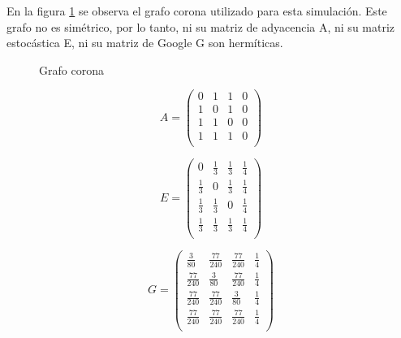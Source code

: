 En la figura \ref{fig:crown} se observa el grafo corona utilizado para esta simulación. Este grafo no es simétrico, por lo tanto, ni su matriz de adyacencia A, ni su matriz estocástica E, ni su matriz de Google G son hermíticas.

\begin{figure}[H]
    \centering
    \caption[Grafo corona]{Grafo corona}
    \label{fig:crown}
\end{figure}

\begin{equation}
    A =
    \begin{pmatrix}
        0 & 1 & 1 & 0 \\
        1 & 0 & 1 & 0 \\
        1 & 1 & 0 & 0 \\
        1 & 1 & 1 & 0 \\
    \end{pmatrix}
\end{equation}

\begin{equation}
    E =
    \begin{pmatrix}
        0 & \frac{1}{3} & \frac{1}{3} & \frac{1}{4} \\
        \frac{1}{3} & 0 & \frac{1}{3} & \frac{1}{4} \\
        \frac{1}{3} & \frac{1}{3} & 0 & \frac{1}{4} \\
        \frac{1}{3} & \frac{1}{3} & \frac{1}{3} & \frac{1}{4} \\
    \end{pmatrix}
\end{equation}

\begin{equation}
    G =
    \begin{pmatrix}
        \frac{3}{80} & \frac{77}{240} & \frac{77}{240} & \frac{1}{4} \\
        \frac{77}{240} & \frac{3}{80} & \frac{77}{240} & \frac{1}{4} \\
        \frac{77}{240} & \frac{77}{240} & \frac{3}{80} & \frac{1}{4} \\
        \frac{77}{240} & \frac{77}{240} & \frac{77}{240} & \frac{1}{4} \\
    \end{pmatrix}
\end{equation}

